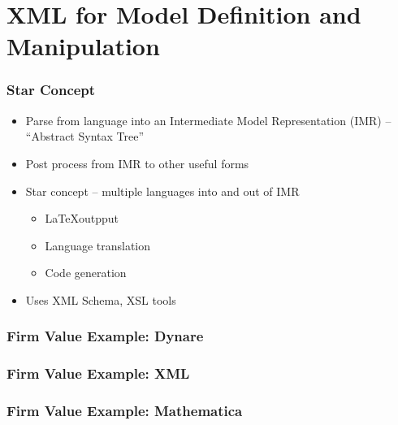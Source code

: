 \documentclass[tikz]{beamer}
\begin{document}




\section{XML for  Model Definition and Manipulation}

\begin{frame}
  \frametitle{Star Concept}
  \begin{itemize}
 \item Parse from language into an Intermediate Model Representation (IMR)
 -- ``Abstract Syntax Tree'' 
  \item Post process from IMR to other useful forms
  \item Star concept --  multiple languages into and out of IMR
    \begin{itemize}
    \item \LaTeX outpput
    \item Language translation
    \item Code generation
    \end{itemize}

  \item Uses XML Schema, XSL tools
  \end{itemize}

\end{frame}

\begin{frame}
  \frametitle{Firm Value Example: Dynare}
{\small
{}
}
\end{frame}

\begin{frame}
  \frametitle{Firm Value Example: XML}
\end{frame}

\begin{frame}
  \frametitle{Firm Value Example: Mathematica}
  
\end{frame}
\end{document}
